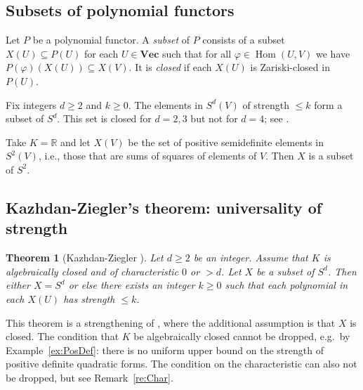 \documentclass{amsart}
\theoremstyle{plain}
\newtheorem{thm}{Theorem}[subsection]
\theoremstyle{definition}
\newcommand{\RR}{\mathbb{R}}
\renewcommand{\phi}{\varphi}
\DeclareMathOperator{\Hom}{Hom}
\renewcommand{\Vec}{\mathbf{Vec}}
\begin{document}
\subsection{Subsets of polynomial functors}

\begin{de}
Let $P$ be a polynomial functor. A {\em subset} of $P$ consists of a
subset $X(U) \subseteq P(U)$ for each $U \in \Vec$ such that for all
$\phi \in \Hom(U,V)$ we have $P(\phi)(X(U)) \subseteq X(V)$. It is {\em
closed} if each $X(U)$ is Zariski-closed in $P(U)$.
\end{de}

\begin{ex}
Fix integers $d\geq 2$ and $k\geq0$.
The elements in $S^d(V)$ of strength $\leq k$
form a subset of $S^d$. This set is closed for $d=2,3$ but
not for $d=4$; see \cite{BBOV:strengthnotclosed}.
\end{ex}

\begin{ex} \label{ex:PosDef}
Take $K=\RR$ and let $X(V)$ be the set of positive semidefinite elements
in $S^2(V)$, i.e., those that are sums of squares of elements
of $V$. Then $X$ is a subset of $S^2$.
\end{ex}

\subsection{Kazhdan-Ziegler's theorem: universality of strength}

\begin{thm}[Kazhdan-Ziegler {\cite[Theorem 1.9]{KZ:strength2}}] \label{thm:KZ}
Let $d \geq2$ be an integer. Assume that $K$ is algebraically closed and
of characteristic $0$ or $>d$.  Let $X$ be a subset of
$S^d$. Then either $X=S^d$ or else there exists an integer $k\geq 0$
such that each polynomial in each $X(U)$ has strength $\leq k$.
\end{thm}

This theorem is a strengthening of \cite[Theorem 4]{BDE:boundedstrength}, where the
additional assumption is that $X$ is closed. The condition that $K$ be
algebraically closed cannot be dropped, e.g.~by Example~\ref{ex:PosDef}:
there is no uniform upper bound on the strength of positive definite
quadratic forms. The condition on the characteristic can also not be
dropped, but see Remark~\ref{re:Char}.
\end{document}
